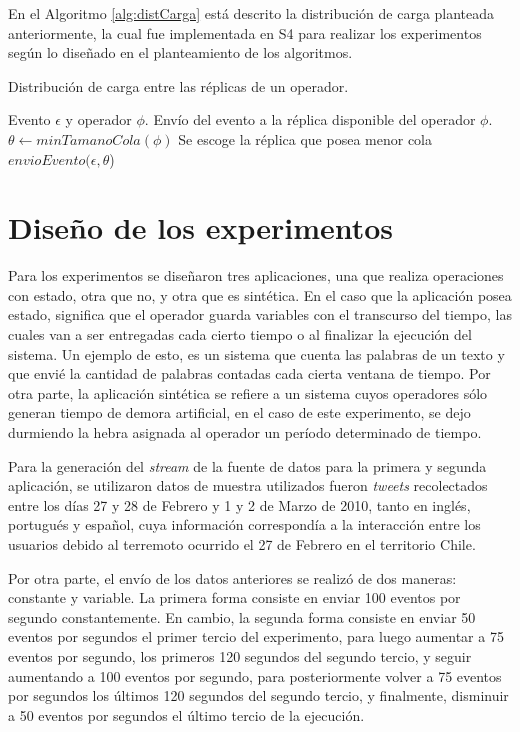 En el Algoritmo \ref{alg:distCarga} está descrito la distribución de carga planteada anteriormente, la cual fue implementada en S4 para realizar los experimentos según lo diseñado en el planteamiento de los algoritmos.

\begin{algorithm}[!ht]
	\caption{Distribución de carga entre las réplicas de un operador.}
	\label{alg:distCarga}
	\begin{algorithmic}[1]
	\REQUIRE Evento $\epsilon$ y operador $\phi$.
	\ENSURE Envío del evento a la réplica disponible del operador $\phi$.
	\STATE $\theta \leftarrow minTamanoCola(\phi)$ \COMMENT Se escoge la réplica que posea menor cola
	\STATE $envioEvento(\epsilon,\theta$)
	\end{algorithmic}
\end{algorithm}

\section{Diseño de los experimentos}
Para los experimentos se diseñaron tres aplicaciones, una que realiza operaciones con estado, otra que no, y otra que es sintética. En el caso que la aplicación posea estado, significa que el operador guarda variables con el transcurso del tiempo, las cuales van a ser entregadas cada cierto tiempo o al finalizar la ejecución del sistema. Un ejemplo de esto, es un sistema que cuenta las palabras de un texto y que envié la cantidad de palabras contadas cada cierta ventana de tiempo. Por otra parte, la aplicación sintética se refiere a un sistema cuyos operadores sólo generan tiempo de demora artificial, en el caso de este experimento, se dejo durmiendo la hebra asignada al operador un período determinado de tiempo.

Para la generación del \textit{stream} de la fuente de datos para la primera y segunda aplicación, se utilizaron datos de muestra utilizados fueron \textit{tweets} recolectados entre los días 27 y 28 de Febrero y 1 y 2 de Marzo de 2010, tanto en inglés, portugués y español, cuya información correspondía a la interacción entre los usuarios debido al terremoto ocurrido el 27 de Febrero en el territorio Chile.

Por otra parte, el envío de los datos anteriores se realizó de dos maneras: constante y variable. La primera forma consiste en enviar 100 eventos por segundo constantemente. En cambio, la segunda forma consiste en enviar 50 eventos por segundos el primer tercio del experimento, para luego aumentar a 75 eventos por segundo, los primeros 120 segundos del segundo tercio, y seguir aumentando a 100 eventos por segundo, para posteriormente volver a 75 eventos por segundos los últimos 120 segundos del segundo tercio, y finalmente, disminuir a 50 eventos por segundos el último tercio de la ejecución.

